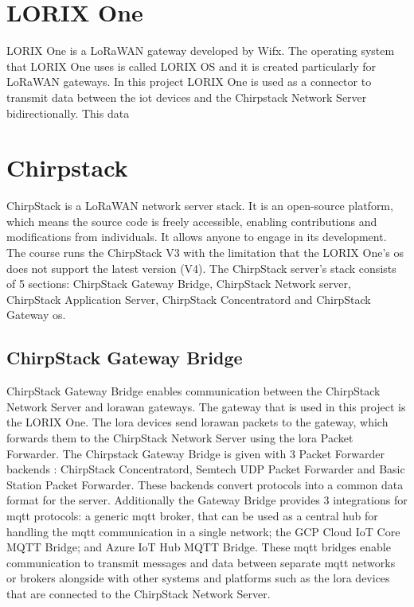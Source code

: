 \section{LORIX One}
LORIX One is a LoRaWAN gateway developed by Wifx.
The operating system that LORIX One uses is called LORIX OS and it is created particularly for LoRaWAN gateways.
In this project LORIX One is used as a connector to transmit data between the \gls{iot} devices and the Chirpstack Network Server bidirectionally.
This data

\section{Chirpstack}
ChirpStack is a LoRaWAN network server stack. It is an open-source platform, which means the source code is freely accessible, enabling contributions and modifications from individuals. It allows anyone to engage in its development.
The course runs the ChirpStack V3 with the limitation that the LORIX One's \gls{os} does not support the latest version (V4).
The ChirpStack server's stack consists of 5 sections: ChirpStack Gateway Bridge, ChirpStack Network server, ChirpStack Application Server, ChirpStack Concentratord and ChirpStack Gateway \gls{os}.

\subsection{ChirpStack Gateway Bridge}
ChirpStack Gateway Bridge enables communication between the ChirpStack Network Server and \gls{lorawan} gateways.
The gateway that is used in this project is the LORIX One.
The \gls{lora} devices send \gls{lorawan} packets to the gateway, which forwards them to the ChirpStack Network Server using the \gls{lora} Packet Forwarder.
The Chirpstack Gateway Bridge is given with 3 Packet Forwarder backends : ChirpStack Concentratord, Semtech UDP Packet Forwarder and Basic Station Packet Forwarder.
These backends convert protocols into a common data format for the server.
Additionally the Gateway Bridge provides 3 integrations for \gls{mqtt} protocols: a generic \gls{mqtt} broker, that can be used as a central hub for handling the \gls{mqtt} communication in a single network; the GCP Cloud IoT Core MQTT Bridge; and Azure IoT Hub MQTT Bridge.
These \gls{mqtt} bridges enable communication to transmit messages and data between separate \gls{mqtt} networks or brokers alongside with other systems and platforms such as the \gls{lora} devices that are connected to the ChirpStack Network Server.

